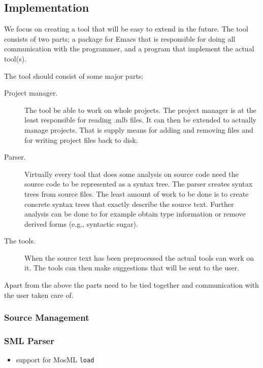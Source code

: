 \documentclass[a4paper,oneside]{memoir}
\begin{document}


\subsection{Implementation}
We focus on creating a tool that will be easy to extend in the
future. The tool consists of two parts; a package for Emacs that is
responsible for doing all communication with the programmer, and a
program that implement the actual tool(s).

The tool should consist of some major parts:
\begin{description}
\item[Project manager.] The tool be able to work on whole
  projects. The project manager is at the least responsible for
  reading .mlb files. It can then be extended to actually manage
  projects. That is supply means for adding and removing files and for
  writing project files back to disk.
\item[Parser.] Virtually every tool that does some analysis on source
  code need the source code to be represented as a syntax tree. The
  parser creates syntax trees from source files. The least amount of
  work to be done is to create concrete syntax trees that exactly
  describe the source text. Further analysis can be done to for
  example obtain type information or remove derived forms (e.g.,
  syntactic sugar).
\item[The tools.] When the source text has been preprocessed the
  actual tools can work on it. The tools can then make suggestions
  that will be sent to the user.
\end{description}

Apart from the above the parts need to be tied together and
communication with the user taken care of.


\subsubsection{Source Management}
\subsubsection{SML Parser}
\begin{itemize}
\item support for MosML \texttt{load}
\end{itemize}
\end{document}
